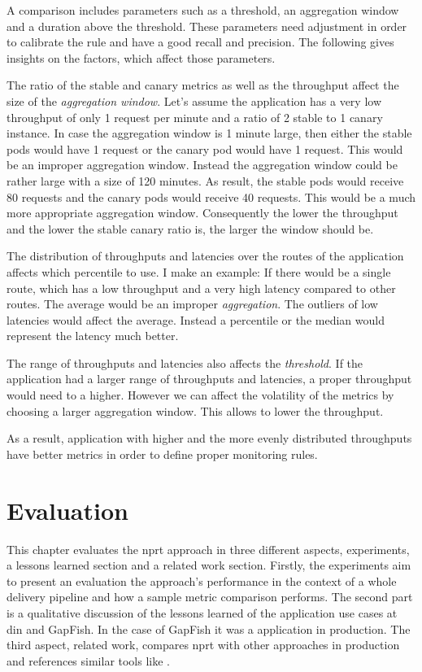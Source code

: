 A comparison includes parameters such as a threshold, an aggregation window and a duration
above the threshold. These parameters need adjustment in order to calibrate the rule and
have a good recall and precision. The following gives insights on the factors, which
affect those parameters.

The ratio of the stable and canary metrics as well as the throughput affect the size of
the \emph{aggregation window}. Let's assume the application has a very low throughput of
only 1 request per minute and a ratio of 2 stable to 1 canary instance. In case the
aggregation window is 1 minute large, then either the stable pods would have 1 request or
the canary pod would have 1 request. This would be an improper aggregation window. Instead
the aggregation window could be rather large with a size of 120 minutes. As result, the
stable pods would receive 80 requests and the canary pods would receive 40 requests. This
would be a much more appropriate aggregation window. Consequently the lower the throughput
and the lower the stable canary ratio is, the larger the window should be.

The distribution of throughputs and latencies over the routes of the application affects
which percentile to use. I make an example: If there would be a single route, which has a
low throughput and a very high latency compared to other routes. The average would be an
improper \emph{aggregation}. The outliers of low latencies would affect the
average. Instead a percentile or the median would represent the latency much better.

The range of throughputs and latencies also affects the \emph{threshold}. If the
application had a larger range of throughputs and latencies, a proper throughput would
need to a higher. However we can affect the volatility of the metrics by choosing a larger
aggregation window. This allows to lower the throughput.

As a result, application with higher and the more evenly distributed throughputs have
better metrics in order to define proper monitoring rules.

\chapter{Evaluation}
\label{chap:eval}

This chapter evaluates the \gls{nprt} approach in three different aspects, experiments, a
lessons learned section and a related work section. Firstly, the experiments aim to
present an evaluation the approach's performance in the context of a whole delivery
pipeline and how a sample metric comparison performs. The second part is a qualitative
discussion of the lessons learned of the application use cases at \gls{din} and GapFish.
In the case of GapFish it was a application in production. The third aspect, related work,
compares \gls{nprt} with other approaches in production and references similar tools like
\deployer.

